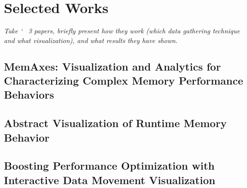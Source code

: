 \section{Selected Works}\label{sec:works}
\textit{Take \char`~ 3 papers, briefly present how they work (which data gathering technique and what visualization), and what results they have shown.}

\subsection{MemAxes: Visualization and Analytics for
Characterizing Complex Memory Performance
Behaviors}\label{sec:memaxes}

\subsection{Abstract Visualization of
Runtime Memory Behavior}\label{sec:abstract}

\subsection{Boosting Performance Optimization with Interactive
Data Movement Visualization}\label{sec:boosting}
